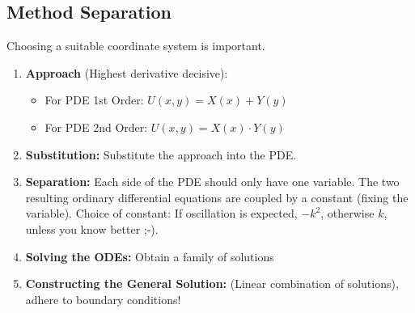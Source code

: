 
\subsection{Method Separation}
Choosing a suitable coordinate system is important.

\begin{enumerate}
\item \textbf{Approach} (Highest derivative decisive):
	\begin{itemize}
		\item For PDE 1st Order: $U(x,y)=X(x) + Y(y)$
		\item For PDE 2nd Order: $U(x,y)=X(x) \cdot Y(y)$
	\end{itemize}
\item \textbf{Substitution: } Substitute the approach into the PDE.
\item \textbf{Separation: } Each side of the PDE should only have one variable. The two resulting ordinary differential equations are coupled by a constant (fixing the variable). Choice of constant: If oscillation is expected, $-k^2$, otherwise $k$, unless you know better ;-).
\item \textbf{Solving the ODEs: } Obtain a family of solutions
\item \textbf{Constructing the General Solution: } (Linear combination of solutions), adhere to boundary conditions!
\end{enumerate}

